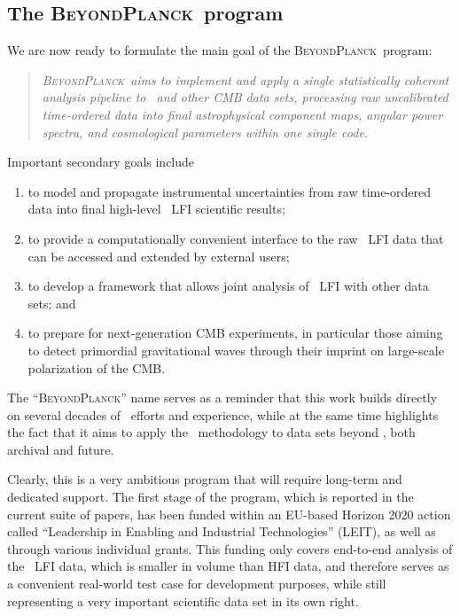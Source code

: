 \documentclass[onecolumn]{aa}
\newcommand{\BP}{\textsc{BeyondPlanck}}
\begin{document}
\subsection{The \BP\ program}
\label{sec:bp_program}

We are now ready to formulate the main goal of the
\BP\ program:
\begin{quotation}
  \emph{\BP\ aims to implement and apply a single statistically
    coherent analysis pipeline to \Planck\ and other CMB data sets,
    processing raw uncalibrated time-ordered data into final
    astrophysical component maps, angular power spectra, and
    cosmological parameters within one single code.}
\end{quotation}
Important secondary goals include
\begin{enumerate}
\item to model and propagate instrumental uncertainties from raw
  time-ordered data into final high-level \Planck\ LFI scientific results;
\item to provide a computationally convenient interface to the raw
  \Planck\ LFI data that can be accessed and extended by external users;
\item to develop a framework that allows joint analysis of \Planck\ LFI with
  other data sets; and
\item to prepare for next-generation CMB experiments, in particular
  those aiming to detect primordial gravitational waves through their
  imprint on large-scale polarization of the CMB.
\end{enumerate}
The ``\BP'' name serves as a reminder that this work builds directly
on several decades of \Planck\ efforts and experience, while at the
same time highlights the fact that it aims to apply the
\Planck\ methodology to data sets beyond \Planck, both archival and
future.

Clearly, this is a very ambitious program that will require long-term
and dedicated support. The first stage of the program, which is
reported in the current suite of papers, has been funded within an
EU-based Horizon 2020 action called ``Leadership in Enabling and
Industrial Technologies'' (LEIT), as well as through various
individual grants. This funding only covers end-to-end analysis of the
\Planck\ LFI data, which is smaller in volume than HFI data, and therefore
serves as a convenient real-world test case for development purposes,
while still representing a very important scientific data set in its
own right.
\end{document}
